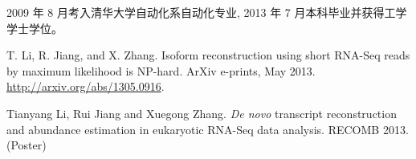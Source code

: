 \begin{resume}


  
  2009 年 8 月考入清华大学自动化系自动化专业, 2013 年 7 月本科毕业并获得工学学士学位。


  \begin{enumerate}[{[}1{]}]
	\item T. Li, R. Jiang, and X. Zhang. 
	Isoform reconstruction using short RNA-Seq reads by maximum likelihood is NP-hard. 
	ArXiv e-prints, May 2013. \url{http://arxiv.org/abs/1305.0916}.

	
	\item Tianyang Li, Rui Jiang and Xuegong Zhang. 
	\textit{De novo} transcript reconstruction and abundance estimation in eukaryotic RNA-Seq data analysis. 
	RECOMB 2013. (Poster)
  \end{enumerate}
  
\end{resume}
